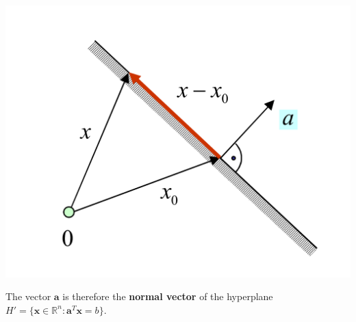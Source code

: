 \documentclass[11pt]{article}
\begin{document}
\noindent
\begin{minipage}{0.3\linewidth}
	\centering
	\includegraphics[width=\linewidth]{normal_vector_hyperplane}
\end{minipage}
\begin{minipage}{0.7\linewidth}
	The vector $\textbf{a}$ is therefore the \textbf{normal vector} of the hyperplane $H'=\{\textbf{x}\in\mathbb{R}^n:\textbf{a}^T\textbf{x}= b\}$.
\end{minipage}
\end{document}
